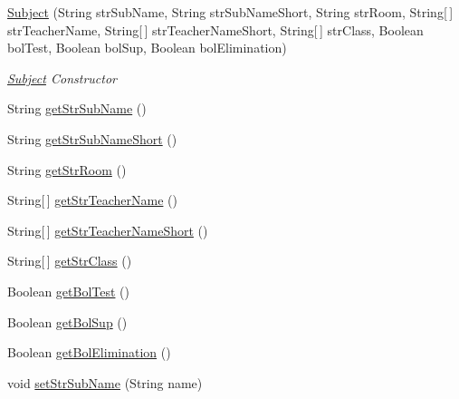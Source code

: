 \begin{DoxyCompactItemize}
\item 
\hyperlink{class_app_test_solution_1_1other_classes_1_1_subject_ac815278789fc304f3475d319b0bb6a26}{Subject} (String str\-Sub\-Name, String str\-Sub\-Name\-Short, String str\-Room, String\mbox{[}$\,$\mbox{]} str\-Teacher\-Name, String\mbox{[}$\,$\mbox{]} str\-Teacher\-Name\-Short, String\mbox{[}$\,$\mbox{]} str\-Class, Boolean bol\-Test, Boolean bol\-Sup, Boolean bol\-Elimination)
\begin{DoxyCompactList}\small\item\em \hyperlink{class_app_test_solution_1_1other_classes_1_1_subject}{Subject} Constructor \end{DoxyCompactList}\item 
String \hyperlink{class_app_test_solution_1_1other_classes_1_1_subject_a7039edd526ccb18636c7a75662d0103d}{get\-Str\-Sub\-Name} ()
\item 
String \hyperlink{class_app_test_solution_1_1other_classes_1_1_subject_afdba3d7cb7d3243d15c35df2f647499b}{get\-Str\-Sub\-Name\-Short} ()
\item 
String \hyperlink{class_app_test_solution_1_1other_classes_1_1_subject_ab5108c46c8ed73af085567f60ac12a90}{get\-Str\-Room} ()
\item 
String\mbox{[}$\,$\mbox{]} \hyperlink{class_app_test_solution_1_1other_classes_1_1_subject_ac61444835bcdce6f0d87ea5edcbc95d5}{get\-Str\-Teacher\-Name} ()
\item 
String\mbox{[}$\,$\mbox{]} \hyperlink{class_app_test_solution_1_1other_classes_1_1_subject_a48f5cd907ea508840a59bdf8a9548b87}{get\-Str\-Teacher\-Name\-Short} ()
\item 
String\mbox{[}$\,$\mbox{]} \hyperlink{class_app_test_solution_1_1other_classes_1_1_subject_a0cdc131df4f8b70ee74dcd0449391324}{get\-Str\-Class} ()
\item 
Boolean \hyperlink{class_app_test_solution_1_1other_classes_1_1_subject_ad1cb1d607d8af6d37665b653b93ea839}{get\-Bol\-Test} ()
\item 
Boolean \hyperlink{class_app_test_solution_1_1other_classes_1_1_subject_a576c9f3f810925a7bd8df288231d3785}{get\-Bol\-Sup} ()
\item 
Boolean \hyperlink{class_app_test_solution_1_1other_classes_1_1_subject_ab556957953508a2670936b6bb674f6df}{get\-Bol\-Elimination} ()
\item 
void \hyperlink{class_app_test_solution_1_1other_classes_1_1_subject_a78ac6931a1d9dfde0c1f68832c987104}{set\-Str\-Sub\-Name} (String name)

\end{DoxyCompactItemize}
